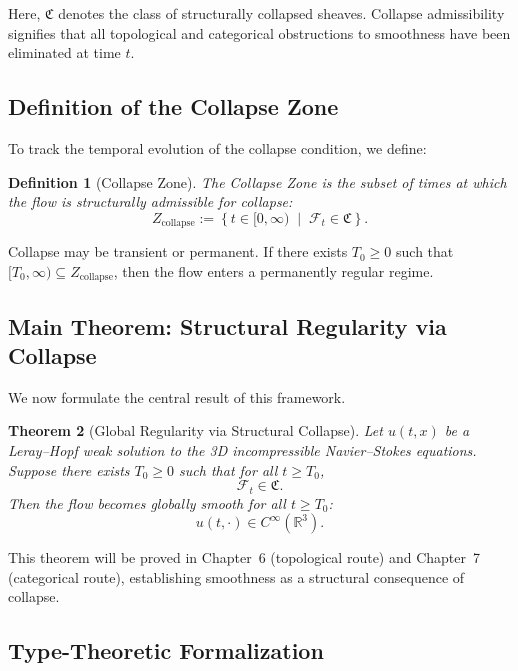 \documentclass[11pt]{article}
\newtheorem{theorem}{Theorem}[section]
\newtheorem{definition}[theorem]{Definition}
\begin{document}
Here, \( \mathfrak{C} \) denotes the class of structurally collapsed sheaves. Collapse admissibility signifies that all topological and categorical obstructions to smoothness have been eliminated at time \( t \).

\subsection{Definition of the Collapse Zone}

To track the temporal evolution of the collapse condition, we define:

\begin{definition}[Collapse Zone]
The \emph{Collapse Zone} is the subset of times at which the flow is structurally admissible for collapse:
\begin{equation}
Z_{\mathrm{collapse}} := \left\{ t \in [0,\infty) \;\middle|\; \mathcal{F}_t \in \mathfrak{C} \right\}.
\end{equation}
\end{definition}

Collapse may be transient or permanent. If there exists \( T_0 \geq 0 \) such that \( [T_0, \infty) \subseteq Z_{\mathrm{collapse}} \), then the flow enters a permanently regular regime.

\subsection{Main Theorem: Structural Regularity via Collapse}

We now formulate the central result of this framework.

\begin{theorem}[Global Regularity via Structural Collapse]
\label{thm:collapse-regularity}
Let \( u(t,x) \) be a Leray--Hopf weak solution to the 3D incompressible Navier--Stokes equations. Suppose there exists \( T_0 \geq 0 \) such that for all \( t \geq T_0 \),
\[
\mathcal{F}_t \in \mathfrak{C}.
\]
Then the flow becomes globally smooth for all \( t \geq T_0 \):
\[
u(t, \cdot) \in C^\infty(\mathbb{R}^3).
\]
\end{theorem}

This theorem will be proved in Chapter~6 (topological route) and Chapter~7 (categorical route), establishing smoothness as a structural consequence of collapse.

\subsection{Type-Theoretic Formalization}
\end{document}
